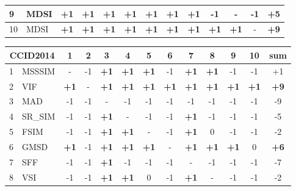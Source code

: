 \begin{table*}[htb]
{\begin{tabular}{|l|l|c|c|c|c|c|c|c|c|c|c||c|}
9         & MDSI           & \textbf{+1} & \textbf{+1} & \textbf{+1} & \textbf{+1} & \textbf{+1} & \textbf{+1} & \textbf{+1} & -1          & -           & -1 & \textbf{+5} \\ \hline
10        & MDSI          & \textbf{+1} & \textbf{+1} & \textbf{+1} & \textbf{+1} & \textbf{+1} & \textbf{+1} & \textbf{+1} & \textbf{+1} & \textbf{+1} & -  & \textbf{+9} \\ \hline
\end{tabular}
\newline
\vspace*{2 mm}
\newline
\begin{tabular}{|l|l|c|c|c|c|c|c|c|c|c|c||c|}
\hline
\multicolumn{2}{|c|}{CCID2014} & 1           & 2  & 3           & 4           & 5           & 6           & 7           & 8           & 9           & 10          & sum         \\ \hline
1           & MSSSIM           & -           & -1 & \textbf{+1} & \textbf{+1} & \textbf{+1} & -1          & \textbf{+1} & \textbf{+1} & -1          & -1          & +1          \\ \hline
2           & VIF              & \textbf{+1} & -  & \textbf{+1} & \textbf{+1} & \textbf{+1} & \textbf{+1} & \textbf{+1} & \textbf{+1} & \textbf{+1} & \textbf{+1} & \textbf{+9} \\ \hline
3           & MAD              & -1          & -1 & -           & -1          & -1          & -1          & -1          & -1          & -1          & -1          & -9          \\ \hline
4           & SR\_SIM          & -1          & -1 & \textbf{+1} & -           & -1          & -1          & \textbf{+1} & -1          & -1          & -1          & -5          \\ \hline
5           & FSIM            & -1          & -1 & \textbf{+1} & \textbf{+1} & -           & -1          & \textbf{+1} & 0           & -1          & -1          & -2          \\ \hline
6           & GMSD             & \textbf{+1} & -1 & \textbf{+1} & \textbf{+1} & \textbf{+1} & -           & \textbf{+1} & \textbf{+1} & \textbf{+1} & 0           & \textbf{+6} \\ \hline
7           & SFF              & -1          & -1 & \textbf{+1} & -1          & -1          & -1          & -           & -1          & -1          & -1          & -7          \\ \hline
8           & VSI              & -1          & -1 & \textbf{+1} & \textbf{+1} & 0           & -1          & \textbf{+1} & -           & -1          & -1          & -2          \\ \hline

\end{tabular}}
\end{table*}

